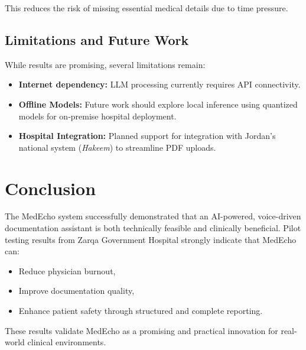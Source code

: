 This reduces the risk of missing essential medical details due to time pressure.

\subsection{Limitations and Future Work}
\label{sec:results:limitations}

While results are promising, several limitations remain:

\begin{itemize}
    \item \textbf{Internet dependency:} LLM processing currently requires API connectivity.
    \item \textbf{Offline Models:} Future work should explore local inference using 
          quantized models for on-premise hospital deployment.
    \item \textbf{Hospital Integration:} Planned support for integration with Jordan’s 
          national system (\textit{Hakeem}) to streamline PDF uploads.
\end{itemize}

\section{Conclusion}
\label{sec:results:conclusion}

The MedEcho system successfully demonstrated that an AI-powered, voice-driven 
documentation assistant is both technically feasible and clinically beneficial.  
Pilot testing results from Zarqa Government Hospital strongly indicate that MedEcho can:

\begin{itemize}
    \item Reduce physician burnout,
    \item Improve documentation quality,
    \item Enhance patient safety through structured and complete reporting.
\end{itemize}

These results validate MedEcho as a promising and practical innovation for real-world 
clinical environments.
